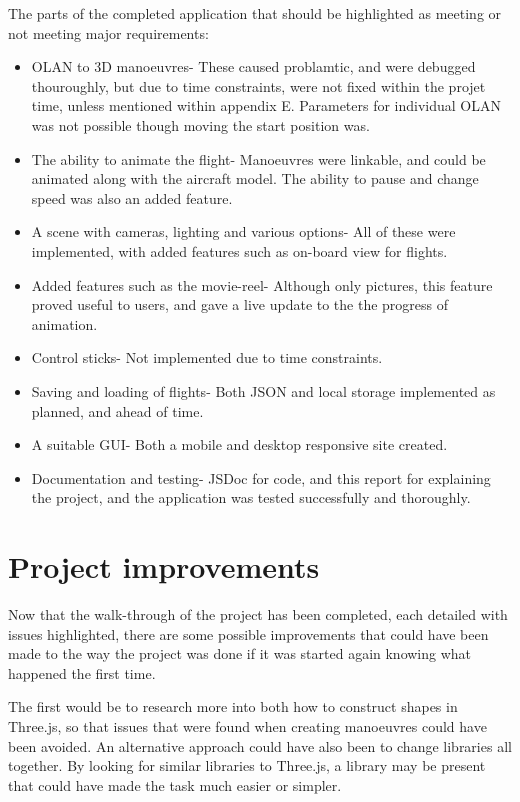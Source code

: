 The parts of the completed application that should be highlighted as meeting or not meeting major requirements:
\begin{itemize}
	\item OLAN to 3D manoeuvres- These caused problamtic, and were debugged thouroughly, but due to time constraints, were not fixed within the projet time, unless mentioned within appendix E. Parameters for individual OLAN was not possible though moving the start position was.
	\item The ability to animate the flight- Manoeuvres were linkable, and could be animated along with the aircraft model. The ability to pause and change speed was also an added feature.
	\item A scene with cameras, lighting and various options- All of these were implemented, with added features such as on-board view for flights.
	\item Added features such as the movie-reel- Although only pictures, this feature proved useful to users, and gave a live update to the the progress of animation.
	\item Control sticks- Not implemented due to time constraints.
	\item Saving and loading of flights- Both JSON and local storage implemented as planned, and ahead of time.
	\item A suitable GUI- Both a mobile and desktop responsive site created.
	\item Documentation and testing- JSDoc for code, and this report for explaining the project, and the application was tested successfully and thoroughly.
\end{itemize}

\section{Project improvements}
Now that the walk-through of the project has been completed, each detailed with issues highlighted, there are some possible improvements that could have been made to the way the project was done if it was started again knowing what happened the first time.

The first would be to research more into both how to construct shapes in Three.js, so that issues that were found when creating manoeuvres could have been avoided. An alternative approach could have also been to change libraries all together. By looking for similar libraries to Three.js, a library may be present that could have made the task much easier or simpler. 

